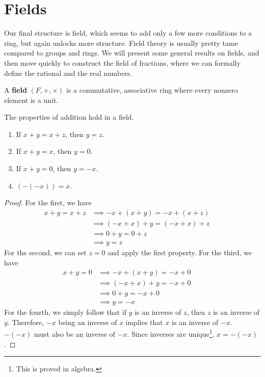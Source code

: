 \section{Fields}  

  Our final structure is field, which seems to add only a few more conditions to a ring, but again unlocks more structure. Field theory is usually pretty tame compared to groups and rings. We will present some general results on fields, and then move quickly to construct the field of fractions, where we can formally define the rational and the real numbers. 

  \begin{definition}[Field]
    A \textbf{field} $(F, +, \times)$ is a commutative, associative ring where every nonzero element is a unit. 
  \end{definition}

  \begin{lemma}
    The properties of addition hold in a field. 
    \begin{enumerate}
      \item If $x + y = x + z$, then $y = z$. 
      \item If $x + y = x$, then $y = 0$. 
      \item If $x + y = 0$, then $y = -x$. 
      \item $(-(-x)) = x$. 
    \end{enumerate}
  \end{lemma}
  \begin{proof}
    For the first, we have 
    \begin{align}
      x + y = x + z & \implies -x + (x + y) = -x + (x + z) && \tag{addition is a function} \\
                    & \implies (-x + x) + y = (-x + x) + z && \tag{$+$ is associative} \\
                    & \implies 0 + y = 0 + z && \tag{definition of additive inverse} \\
                    & \implies y = z && \tag{definition of identity}
    \end{align} 
    For the second, we can set $z = 0$ and apply the first property. For the third, we have 
    \begin{align}
      x + y = 0 & \implies -x + (x + y) = -x + 0 && \tag{addition is a function} \\
                & \implies (-x + x) + y = -x + 0 && \tag{$+$ is associative} \\
                & \implies 0 + y = -x + 0 && \tag{definition of additive inverse} \\
                & \implies y = -x && \tag{definition of identity}
    \end{align}
    For the fourth, we simply follow that if $y$ is an inverse of $z$, then $z$ is an inverse of $y$. Therefore, $-x$ being an inverse of $x$ implies that $x$ is an inverse of $-x$. $-(-x)$ must also be an inverse of $-x$. Since inverses are unique\footnote{This is proved in algebra.}, $x = -(-x)$. 
  \end{proof}

